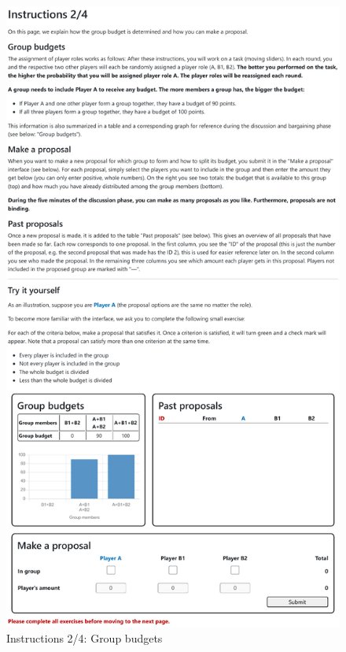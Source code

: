 \begin{figure}[!htb]
    \centering
    \includegraphics[width=.7\linewidth]{screenshots/instructions_2.pdf}
    \caption{Instructions 2/4: Group budgets}
\end{figure}



